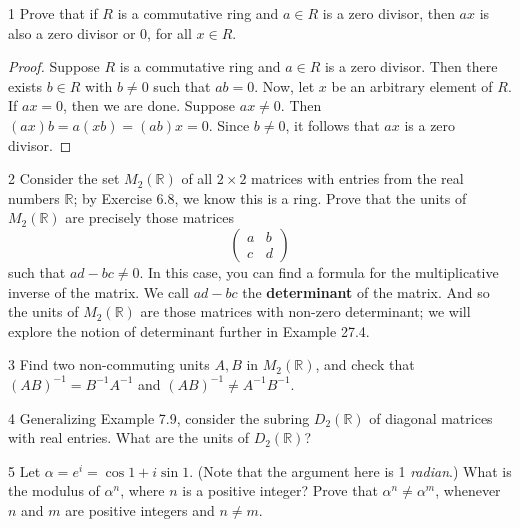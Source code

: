 \begin{problem}{1}
    Prove that if $R$ is a commutative ring 
    and $a \in R$ is a zero divisor, then $ax$
    is also a zero divisor or $0$, for all $x \in R$.
\end{problem}
\solved

\begin{proof}
    Suppose $R$ is a commutative ring and $a \in R$ is a zero divisor.
    Then there exists $b \in R$ with $b \ne 0$ such that $ab = 0$.
    Now, let $x$ be an arbitrary element of $R$.
    If $ax = 0$, then we are done.
    Suppose $ax \ne 0$.
    Then $(ax)b = a(xb) = (ab)x = 0$.   
    Since $b \ne 0$, it follows that $ax$ is a zero divisor.
\end{proof}

\begin{problem}{2}
    Consider the set $M_2(\mathbb{R})$ of all $2 \times 2$ matrices with entries from the
    real numbers $\mathbb{R}$; by Exercise 6.8, we know this is a ring. Prove that the
    units of $M_2(\mathbb{R})$ are precisely those matrices
    \[\begin{pmatrix} a & b \\ c & d \end{pmatrix}\]
    such that $ad - bc \neq 0$. In this case, you can find a formula for the
    multiplicative inverse of the matrix. We call $ad - bc$ the \textbf{determinant} of
    the matrix. And so the units of $M_2(\mathbb{R})$ are those matrices with non-zero
    determinant; we will explore the notion of determinant further in Example 27.4.
\end{problem}
\unsolved

\begin{problem}{3}
    Find two non-commuting units $A, B$ in $M_2(\mathbb{R})$, and check that
    ${(AB)}^{-1} = B^{-1}A^{-1}$ and ${(AB)}^{-1} \neq A^{-1}B^{-1}$.
\end{problem}
\unsolved

\begin{problem}{4}
    Generalizing Example 7.9, consider the subring $D_2(\mathbb{R})$ of diagonal matrices
    with real entries. What are the units of $D_2(\mathbb{R})$?
\end{problem}
\unsolved

\begin{problem}{5}
    Let $\alpha = e^i = \cos 1 + i \sin 1$. (Note that the argument here is 1
    \emph{radian}.) What is the modulus of $\alpha^n$, where $n$ is a positive integer?
    Prove that $\alpha^n \neq \alpha^m$, whenever $n$ and $m$ are positive integers and
    $n \neq m$.
\end{problem}
\unsolved

